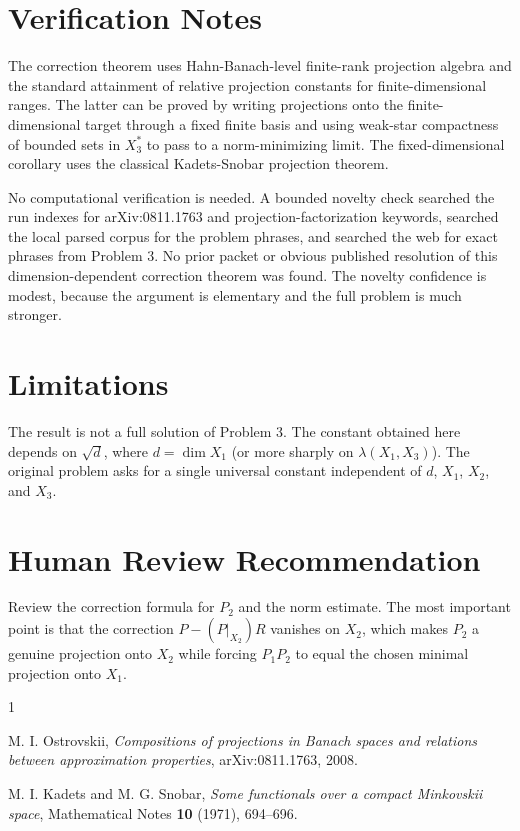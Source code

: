 \documentclass[11pt]{article}
\begin{document}
\section*{Verification Notes}

The correction theorem uses Hahn-Banach-level finite-rank projection algebra
and the standard attainment of relative projection constants for
finite-dimensional ranges.  The latter can be proved by writing projections
onto the finite-dimensional target through a fixed finite basis and using
weak-star compactness of bounded sets in $X_3^*$ to pass to a norm-minimizing
limit.  The fixed-dimensional corollary uses the classical Kadets-Snobar
projection theorem.

No computational verification is needed.  A bounded novelty check searched the
run indexes for arXiv:0811.1763 and projection-factorization keywords, searched
the local parsed corpus for the problem phrases, and searched the web for exact
phrases from Problem 3.  No prior packet or obvious published resolution of
this dimension-dependent correction theorem was found.  The novelty confidence
is modest, because the argument is elementary and the full problem is much
stronger.

\section*{Limitations}

The result is not a full solution of Problem 3.  The constant obtained here
depends on $\sqrt d$, where $d=\dim X_1$ (or more sharply on
$\lambda(X_1,X_3)$).  The original problem asks for a single universal constant
independent of $d$, $X_1$, $X_2$, and $X_3$.

\section*{Human Review Recommendation}

Review the correction formula for $P_2$ and the norm estimate.  The most
important point is that the correction $P-(P|_{X_2})R$ vanishes on $X_2$,
which makes $P_2$ a genuine projection onto $X_2$ while forcing $P_1P_2$ to
equal the chosen minimal projection onto $X_1$.

\begin{thebibliography}{1}

M. I. Ostrovskii,
\emph{Compositions of projections in Banach spaces and relations between
approximation properties},
arXiv:0811.1763, 2008.

M. I. Kadets and M. G. Snobar,
\emph{Some functionals over a compact Minkovskii space},
Mathematical Notes \textbf{10} (1971), 694--696.

\end{thebibliography}
\end{document}
